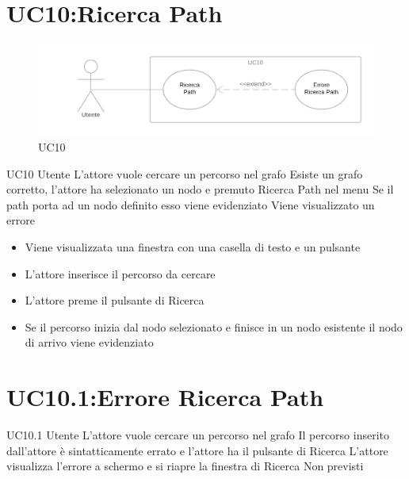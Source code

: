 \documentclass[../AnalisideiRequisiti.tex]{subfiles}
\begin{document}
\section{UC10:Ricerca Path}
\begin{figure}[H]
	\caption{UC10}
	\centering
	\includegraphics[width=\textwidth]{../img/UC10.png}
\end{figure}
\UserCase
{UC10}
{Utente}
{}
{L'attore vuole cercare un percorso nel grafo}
{Esiste un grafo corretto, l'attore ha selezionato un nodo e premuto Ricerca Path nel menu}
{Se il path porta ad un nodo definito esso viene evidenziato }
{Viene visualizzato un errore }
{
	\begin{itemize}
		\item{} Viene visualizzata una finestra con una casella di testo e un pulsante
		\item{} L'attore inserisce il percorso da cercare
		\item{} L'attore preme il pulsante di Ricerca
		\item{} Se il percorso inizia dal nodo selezionato e finisce in un nodo esistente il nodo di arrivo viene evidenziato 
 	\end{itemize}
}

\section{UC10.1:Errore Ricerca Path}
\UserCase
{UC10.1}
{Utente}
{}
{L'attore vuole cercare un percorso nel grafo}
{Il percorso inserito dall'attore è sintatticamente errato e l'attore ha il pulsante di Ricerca}
{L'attore visualizza l'errore a schermo e si riapre la finestra di Ricerca }
{Non previsti}
{}
\end{document}
